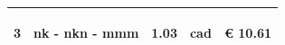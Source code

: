 \documentclass[a4paper]{article}
\begin{document}
\begin{tabular}{ | L{10mm} |  L{86mm} | L{12mm} | L{12mm} | L{16mm} | }
                                   
                                     \vspace{2.5mm}
                                     \begin{spacing}{0}
                                  3
                                     \end{spacing} &
                                     \vspace{2.5mm}
                                     \begin{spacing}{0}
                                  nk - nkn - \newline mmm
                                     \end{spacing} &
                                     \vspace{2.5mm}
                                     \begin{spacing}{0}
                                  1.03
                                     \end{spacing} &
                                     \vspace{2.5mm}
                                     \begin{spacing}{0}
                                  cad
                                     \end{spacing} &
                                     \vspace{2.5mm}
                                     \begin{spacing}{0}
                                       \euro\hfill 
                                   10.61
                                     \end{spacing} \\
                                     \hline
    
                                   \end{tabular} \\
\end{document}
